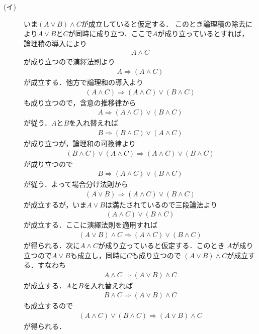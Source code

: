 	\begin{prf}\mbox{}
		\begin{description}
			\item[(イ)] いま$(A \vee B) \wedge C$が成立していると仮定する．
				このとき論理積の除去により$A \vee B$と$C$が同時に成り立つ．ここで$A$が成り立っているとすれば，
				論理積の導入により
				\begin{align}
					A \wedge C
				\end{align}
				が成り立つので演繹法則より
				\begin{align}
					A \Longrightarrow (A \wedge C)
				\end{align}
				が成立する．他方で論理和の導入より
				\begin{align}
					(A \wedge C) \Longrightarrow (A \wedge C) \vee (B \wedge C)
				\end{align}
				も成り立つので，含意の推移律から
				\begin{align}
					A \Longrightarrow (A \wedge C) \vee (B \wedge C)
				\end{align}
				が従う．$A$と$B$を入れ替えれば
				\begin{align}
					B \Longrightarrow (B \wedge C) \vee (A \wedge C)
				\end{align}
				が成り立つが，論理和の可換律より
				\begin{align}
					(B \wedge C) \vee (A \wedge C) \Longrightarrow (A \wedge C) \vee (B \wedge C)
				\end{align}
				が成り立つので
				\begin{align}
					B \Longrightarrow (A \wedge C) \vee (B \wedge C)
				\end{align}
				が従う．よって場合分け法則から
				\begin{align}
					(A \vee B) \Longrightarrow (A \wedge C) \vee (B \wedge C)
				\end{align}
				が成立するが，いま$A \vee B$は満たされているので三段論法より
				\begin{align}
					(A \wedge C) \vee (B \wedge C)
				\end{align}
				が成立する．ここに演繹法則を適用すれば
				\begin{align}
					(A \vee B) \wedge C \Longrightarrow (A \wedge C) \vee (B \wedge C)
				\end{align}
				が得られる．次に$A \wedge C$が成り立っていると仮定する．このとき
				$A$が成り立つので$A \vee B$も成立し，同時に$C$も成り立つので
				$(A \vee B) \wedge C$が成立する．すなわち
				\begin{align}
					A \wedge C \Longrightarrow (A \vee B) \wedge C
				\end{align}
				が成立する．$A$と$B$を入れ替えれば
				\begin{align}
					B \wedge C \Longrightarrow (A \vee B) \wedge C
				\end{align}
				も成立するので
				\begin{align}
					(A \wedge C) \vee (B \wedge C) \Longrightarrow (A \vee B) \wedge C
				\end{align}
				が得られる．
				

\end{description}
\end{prf}

